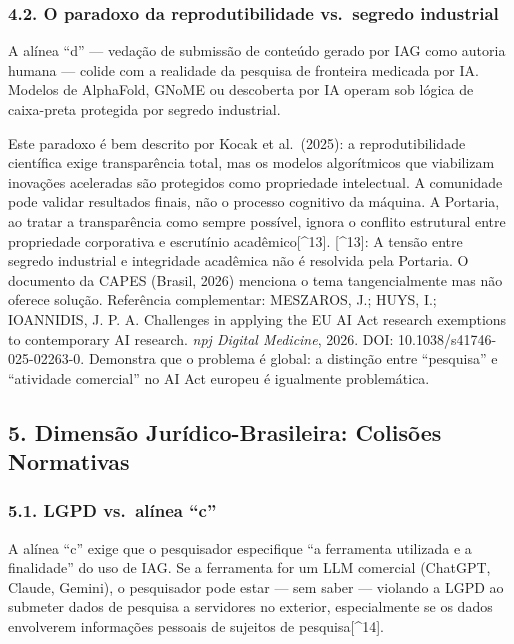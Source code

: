 \documentclass[
  12pt,
  a4paper,
  brazil
]{article}
\begin{document}
\subsubsection{4.2. O paradoxo da reprodutibilidade vs.~segredo
industrial}\label{o-paradoxo-da-reprodutibilidade-vs.-segredo-industrial}

A alínea ``d'' --- vedação de submissão de conteúdo gerado por IAG como
autoria humana --- colide com a realidade da pesquisa de fronteira
medicada por IA. Modelos de AlphaFold, GNoME ou descoberta por IA operam
sob lógica de caixa-preta protegida por segredo industrial.

Este paradoxo é bem descrito por Kocak et al.~(2025): a
reprodutibilidade científica exige transparência total, mas os modelos
algorítmicos que viabilizam inovações aceleradas são protegidos como
propriedade intelectual. A comunidade pode validar resultados finais,
não o processo cognitivo da máquina. A Portaria, ao tratar a
transparência como sempre possível, ignora o conflito estrutural entre
propriedade corporativa e escrutínio acadêmico{[}\^{}13{]}.
{[}\^{}13{]}: A tensão entre segredo industrial e integridade acadêmica
não é resolvida pela Portaria. O documento da CAPES (Brasil, 2026)
menciona o tema tangencialmente mas não oferece solução. Referência
complementar: MESZAROS, J.; HUYS, I.; IOANNIDIS, J. P. A. Challenges in
applying the EU AI Act research exemptions to contemporary AI research.
\emph{npj Digital Medicine}, 2026. DOI: 10.1038/s41746-025-02263-0.
Demonstra que o problema é global: a distinção entre ``pesquisa'' e
``atividade comercial'' no AI Act europeu é igualmente problemática.

\subsection{5. Dimensão Jurídico-Brasileira: Colisões
Normativas}\label{dimensuxe3o-juruxeddico-brasileira-colisuxf5es-normativas}

\subsubsection{5.1. LGPD vs.~alínea ``c''}\label{lgpd-vs.-aluxednea-c}

A alínea ``c'' exige que o pesquisador especifique ``a ferramenta
utilizada e a finalidade'' do uso de IAG. Se a ferramenta for um LLM
comercial (ChatGPT, Claude, Gemini), o pesquisador pode estar --- sem
saber --- violando a LGPD ao submeter dados de pesquisa a servidores no
exterior, especialmente se os dados envolverem informações pessoais de
sujeitos de pesquisa{[}\^{}14{]}.
\end{document}

